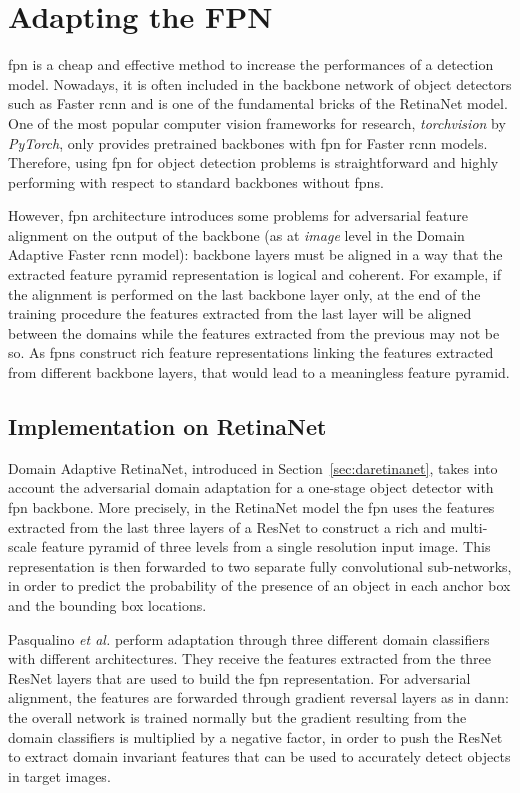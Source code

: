 \documentclass[%
    corpo=12pt,
    twoside,
    stile=classica,   
    tipotesi=magistrale,
    evenboxes,
    english,
	numerazioneromana,
]{toptesi}
\begin{document}
\section{Adapting the FPN}
\acrfull{fpn} is a cheap and effective method to increase the performances of a detection model. Nowadays, it is often included in the backbone network of object detectors such as Faster \gls{rcnn} and is one of the fundamental bricks of the RetinaNet model. One of the most popular computer vision frameworks for research, \textit{torchvision} by \textit{PyTorch}\cite{paszke2019pytorch}, only provides pretrained backbones with \gls{fpn} for Faster \gls{rcnn} models. Therefore, using \gls{fpn} for object detection problems is straightforward and highly performing with respect to standard backbones without \glspl{fpn}.

However, \gls{fpn} architecture introduces some problems for adversarial feature alignment on the output of the backbone (as at \textit{image} level in the Domain Adaptive Faster \gls{rcnn} model): backbone layers must be aligned in a way that the extracted feature pyramid representation is logical and coherent. For example, if the alignment is performed on the last backbone layer only, at the end of the training procedure the features extracted from the last layer will be aligned between the domains while the features extracted from the previous may not be so. As \glspl{fpn} construct rich feature representations linking the features extracted from different backbone layers, that would lead to a meaningless feature pyramid. 

\subsection{Implementation on RetinaNet}
Domain Adaptive RetinaNet, introduced in Section~\ref{sec:daretinanet}, takes into account the adversarial domain adaptation for a one-stage object detector with \gls{fpn} backbone. More precisely, in the RetinaNet model the \gls{fpn} uses the features extracted from the last three layers of a ResNet to construct a rich and multi-scale feature pyramid of three levels from a single resolution input image. This representation is then forwarded to two separate fully convolutional sub-networks, in order to predict the probability of the presence of an object in each anchor box and the bounding box locations.

Pasqualino \textit{et al.} perform adaptation through three different domain classifiers with different architectures. They receive the features extracted from the three ResNet layers that are used to build the \gls{fpn} representation. For adversarial alignment, the features are forwarded through gradient reversal layers as in \gls{dann}: the overall network is trained normally but the gradient resulting from the domain classifiers is multiplied by a negative factor, in order to push the ResNet to extract domain invariant features that can be used to accurately detect objects in target images.
\end{document}
